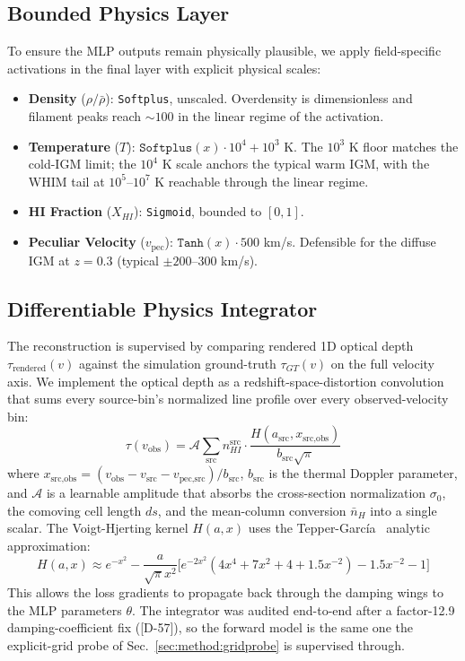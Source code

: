 \subsection{Bounded Physics Layer}
To ensure the MLP outputs remain physically plausible, we apply field-specific activations in the final layer with explicit physical scales:
\begin{itemize}
    \item \textbf{Density} ($\rho/\bar{\rho}$): \texttt{Softplus}, unscaled. Overdensity is dimensionless and filament peaks reach $\sim 100$ in the linear regime of the activation.
    \item \textbf{Temperature} ($T$): $\texttt{Softplus}(x) \cdot 10^4 + 10^3$ K. The $10^3$ K floor matches the cold-IGM limit; the $10^4$ K scale anchors the typical warm IGM, with the WHIM tail at $10^5$--$10^7$ K reachable through the linear regime.
    \item \textbf{HI Fraction} ($X_{HI}$): \texttt{Sigmoid}, bounded to $[0, 1]$.
    \item \textbf{Peculiar Velocity} ($v_{\text{pec}}$): $\texttt{Tanh}(x) \cdot 500$ km/s. Defensible for the diffuse IGM at $z=0.3$ (typical $\pm 200$--$300$ km/s).
\end{itemize}

\subsection{Differentiable Physics Integrator}
The reconstruction is supervised by comparing rendered 1D optical depth $\tau_{\text{rendered}}(v)$ against the simulation ground-truth $\tau_{GT}(v)$ on the full velocity axis. We implement the optical depth as a redshift-space-distortion convolution that sums every source-bin's normalized line profile over every observed-velocity bin:
\begin{equation}
\tau(v_{\text{obs}}) = \mathcal{A} \sum_{\text{src}} n_{HI}^{\text{src}} \cdot \frac{H(a_{\text{src}}, x_{\text{src,obs}})}{b_{\text{src}}\sqrt{\pi}}
\end{equation}
where $x_{\text{src,obs}} = (v_{\text{obs}} - v_{\text{src}} - v_{\text{pec},\text{src}}) / b_{\text{src}}$, $b_{\text{src}}$ is the thermal Doppler parameter, and $\mathcal{A}$ is a learnable amplitude that absorbs the cross-section normalization $\sigma_0$, the comoving cell length $ds$, and the mean-column conversion $\bar{n}_H$ into a single scalar. The Voigt-Hjerting kernel $H(a, x)$ uses the Tepper-Garc\'ia~\cite{tepper2006voigt} analytic approximation:
\begin{equation}
H(a, x) \approx e^{-x^2} - \frac{a}{\sqrt{\pi} x^2} \big[ e^{-2x^2} (4x^4 + 7x^2 + 4 + 1.5x^{-2}) - 1.5x^{-2} - 1 \big]
\end{equation}
This allows the loss gradients to propagate back through the damping wings to the MLP parameters $\theta$. The integrator was audited end-to-end after a factor-12.9 damping-coefficient fix ([D-57]), so the forward model is the same one the explicit-grid probe of Sec.~\ref{sec:method:gridprobe} is supervised through.

